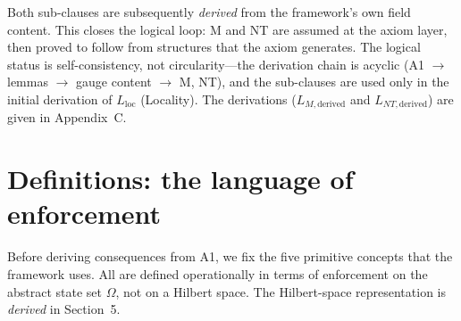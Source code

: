 \documentclass[11pt]{article}
\begin{document}
Both sub-clauses are subsequently \emph{derived} from the framework's own field content.  This closes the logical loop: M and NT are assumed at the axiom layer, then proved to follow from structures that the axiom generates.  The logical status is self-consistency, not circularity---the derivation chain is acyclic (A1 $\to$ lemmas $\to$ gauge content $\to$ M, NT), and the sub-clauses are used only in the initial derivation of $L_{\mathrm{loc}}$ (Locality).  The derivations ($L_{M,\mathrm{derived}}$ and $L_{NT,\mathrm{derived}}$) are given in Appendix~C.


\section{Definitions: the language of enforcement}
\label{sec:defs}

Before deriving consequences from A1, we fix the five primitive concepts that the framework uses.  All are defined operationally in terms of enforcement on the abstract state set $\Omega$, not on a Hilbert space.  The Hilbert-space representation is \emph{derived} in Section~5.
\end{document}
